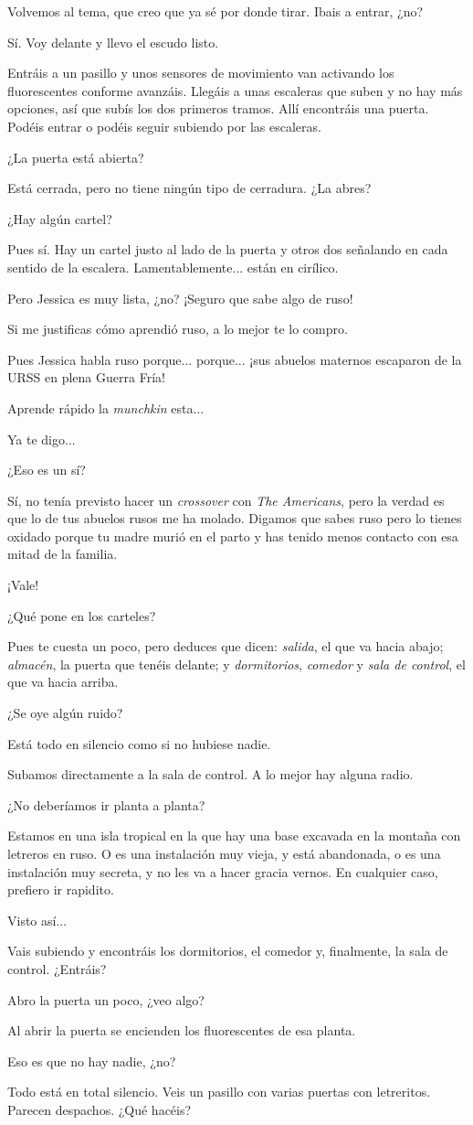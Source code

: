 \documentclass[10pt, a5paper, twocolumn]{article}
\newenvironment{dialogue}
    {\begin{description}[leftmargin=!,align=right,labelwidth=0.cm]}
    {\end{description}}
\newcommand\A{\item[\raisebox{-0.25em}{\scalebox{0.75}{\bctetraedre}}]}
\newcommand\B{\item[\raisebox{-0.25em}{\scalebox{0.75}{\bccube}}]}
\newcommand\E{\item[\raisebox{-0.25em}{\scalebox{0.75}{\bcicosaedre}}]}
\begin{document}
    \begin{dialogue}
        \E Volvemos al tema, que creo que ya sé por donde tirar. Ibais a entrar, ¿no?
        \B Sí. Voy delante y llevo el escudo listo.
        \E Entráis a un pasillo y unos sensores de movimiento van activando los fluorescentes conforme avanzáis. Llegáis a unas escaleras que suben y no hay más opciones, así que subís los dos primeros tramos. Allí encontráis una puerta. Podéis entrar o podéis seguir subiendo por las escaleras.
        \B ¿La puerta está abierta?
        \E Está cerrada, pero no tiene ningún tipo de cerradura. ¿La abres?
        \A ¿Hay algún cartel?
        \E Pues sí. Hay un cartel justo al lado de la puerta y otros dos señalando en cada sentido de la escalera. Lamentablemente... están en cirílico.
        \A Pero Jessica es muy lista, ¿no? ¡Seguro que sabe algo de ruso!
        \E Si me justificas cómo aprendió ruso, a lo mejor te lo compro.
        \A Pues Jessica habla ruso porque... porque... ¡sus abuelos maternos escaparon de la URSS en plena Guerra Fría!
        \E Aprende rápido la \emph{munchkin} esta...
        \B Ya te digo...
        \A ¿Eso es un sí?
        \E Sí, no tenía previsto hacer un \emph{crossover} con \emph{The Americans}, pero la verdad es que lo de tus abuelos rusos me ha molado. Digamos que sabes ruso pero lo tienes oxidado porque tu madre murió en el parto y has tenido menos contacto con esa mitad de la familia.
        \A ¡Vale!
        \B ¿Qué pone en los carteles?
        \E Pues te cuesta un poco, pero deduces que dicen: \emph{salida}, el que va hacia abajo; \emph{almacén}, la puerta que tenéis delante; y \emph{dormitorios}, \emph{comedor} y \emph{sala de control}, el que va hacia arriba.
        \B ¿Se oye algún ruido?
        \E Está todo en silencio como si no hubiese nadie.
        \B Subamos directamente a la sala de control. A lo mejor hay alguna radio.
        \A ¿No deberíamos ir planta a planta?
        \B Estamos en una isla tropical en la que hay una base excavada en la montaña con letreros en ruso. O es una instalación muy vieja, y está abandonada, o es una instalación muy secreta, y no les va a hacer gracia vernos. En cualquier caso, prefiero ir rapidito.
        \A Visto así...
        \E Vais subiendo y encontráis los dormitorios, el comedor y, finalmente, la sala de control. ¿Entráis?
        \B Abro la puerta un poco, ¿veo algo?
        \E Al abrir la puerta se encienden los fluorescentes de esa planta.
        \A Eso es que no hay nadie, ¿no?
        \E Todo está en total silencio. Veis un pasillo con varias puertas con letreritos. Parecen despachos. ¿Qué hacéis?

\end{dialogue}
\end{document}
